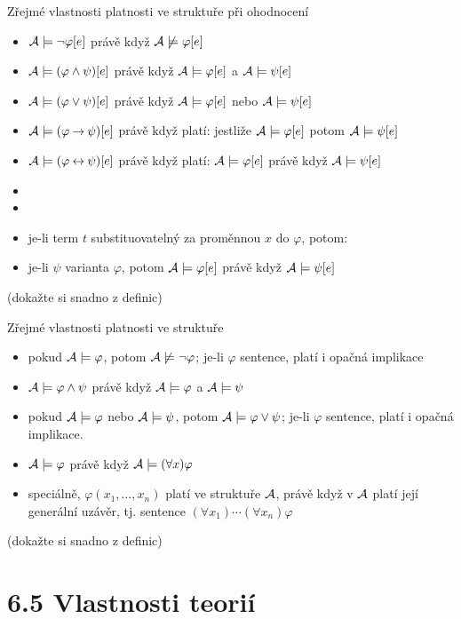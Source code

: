 \documentclass{beamer}
\begin{document}
\begin{frame}{Zřejmé vlastnosti platnosti ve struktuře při ohodnocení}

    \begin{itemize}
        \item $\mathcal{A}\models\neg\varphi[e]$ právě když $\mathcal{A}\not\models\varphi[e]$
        \item $\mathcal{A}\models(\varphi\land\psi)[e]$ právě když $\mathcal{A}\models\varphi[e]$ a $\mathcal{A}\models\psi[e]$
        \item $\mathcal{A}\models(\varphi\lor\psi)[e]$ právě když $\mathcal{A}\models\varphi[e]$ nebo $\mathcal{A}\models\psi[e]$
        \item $\mathcal{A}\models(\varphi\mathbin{\rightarrow}\psi)[e]$ právě když platí: jestliže $\mathcal{A}\models\varphi[e]$ potom $\mathcal{A} \models\psi[e]$
        \item $\mathcal{A}\models(\varphi\mathbin{\leftrightarrow}\psi)[e]$ právě když platí: $\mathcal{A}\models\varphi[e]$ právě když $\mathcal{A}\models\psi[e]
        $
        \item {}
        \item {}
        \item je-li term $t$ substituovatelný za proměnnou $x$ do $\varphi$, potom:
        \item je-li $\psi$ varianta $\varphi$, potom $\mathcal{A}\models\varphi[e]$ právě když $\mathcal{A}\models\psi[e]$
    \end{itemize}

    (dokažte si snadno z definic)   

\end{frame}


\begin{frame}{Zřejmé vlastnosti platnosti ve struktuře}

    \begin{itemize}
        \item pokud $\mathcal{A}\models\varphi$, potom $\mathcal{A}\not\models\neg\varphi$; je-li $\varphi$ sentence, platí i opačná implikace
        \item $\mathcal{A}\models\varphi\land\psi$ právě když $\mathcal{A}\models\varphi$ a $\mathcal{A}\models\psi$
        \item pokud $\mathcal{A}\models\varphi$ nebo $\mathcal{A}\models\psi$, potom $\mathcal{A}\models\varphi\lor\psi$; je-li $\varphi$ sentence,  platí i opačná implikace.
        \item $\mathcal{A}\models\varphi$ právě když $\mathcal{A}\models
        (\forall x)\varphi$
        \item speciálně, $\varphi(x_1,\dots,x_n)$ platí ve struktuře $\mathcal{A}$, právě když v $\mathcal{A}$ platí její \alert{generální uzávěr}, tj. sentence $(\forall x_1)\cdots(\forall x_n)\varphi$ 
    \end{itemize}

    (dokažte si snadno z definic) 

\end{frame}


\section{6.5 Vlastnosti teorií}
\end{document}
